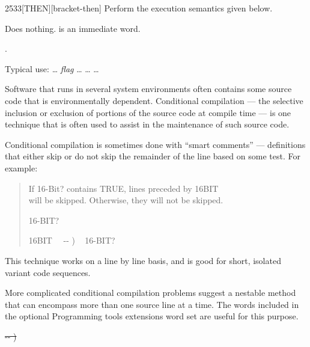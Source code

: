\begin{worddef}{2533}{[THEN]}[bracket-then]
\compile
	Perform the execution semantics given below.

\execute
	\stack{}{}

	Does nothing. \word{[THEN]} is an immediate word.

\see {}%
	.

	\begin{rationale} %
		Typical use:
			{\ldots} \emph{flag}
			\word[tools]{[IF]} {\ldots}
			\word[tools]{[ELSE]} {\ldots}
			\word[tools]{[THEN]} {\ldots}

		Software that runs in several system environments often
		contains some source code that is environmentally dependent.
		Conditional compilation --- the selective inclusion or
		exclusion of portions of the source code at compile time ---
		is one technique that is often used to assist in the
		maintenance of such source code.

		Conditional compilation is sometimes done with ``smart
		comments'' --- definitions that either skip or do not skip
		the remainder of the line based on some test. For example:

		\begin{quote}\ttfamily
			 If 16-Bit? contains TRUE, lines preceded by 16BIT\bs \\
			 will be skipped. Otherwise, they will not be skipped.

			 16-BIT?

			\word{:} 16BIT\bs~~ -{}- ) ~
				16-BIT?  ~
				 ~   ~  \\
			\word{;} 
		\end{quote}

		This technique works on a line by line basis, and is good for
		short, isolated variant code sequences.

		More complicated conditional compilation problems suggest a
		nestable method that can encompass more than one source line
		at a time. The words included in the optional Programming tools
		extensions word set are useful for this purpose.
	\end{rationale}

	\begin{implement} %
		\cbstart{}
		\sout{\word{:} \word{[THEN]}  -{}- ) \word{;} }
		\cbend
	\end{implement}


\end{worddef}
